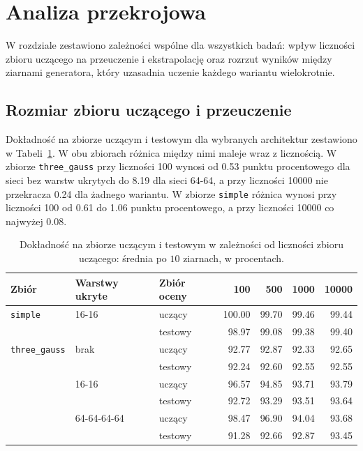 \section{Analiza przekrojowa}
\label{sec:cross}

W rozdziale zestawiono zależności wspólne dla wszystkich badań: wpływ liczności zbioru uczącego na przeuczenie i ekstrapolację oraz rozrzut wyników między ziarnami generatora, który uzasadnia uczenie każdego wariantu wielokrotnie.

\subsection{Rozmiar zbioru uczącego i przeuczenie}
\label{sec:cross-size}

Dokładność na zbiorze uczącym i testowym dla wybranych architektur zestawiono w Tabeli~\ref{tab:cross-size-classification}. W obu zbiorach różnica między nimi maleje wraz z licznością. W zbiorze \texttt{three\_gauss} przy liczności \num{100} wynosi od \num{0.53} punktu procentowego dla sieci bez warstw ukrytych do \num{8.19} dla sieci 64-64, a przy liczności \num{10000} nie przekracza \num{0.24} dla żadnego wariantu. W zbiorze \texttt{simple} różnica wynosi przy liczności \num{100} od \num{0.61} do \num{1.06} punktu procentowego, a przy liczności \num{10000} co najwyżej \num{0.08}.

\begin{table}[H]
    \centering
    \caption{Dokładność na zbiorze uczącym i testowym w zależności od liczności zbioru uczącego: średnia po $10$ ziarnach, w procentach.}
    \label{tab:cross-size-classification}
    \begin{tabular}{lllrrrr}
        \toprule
        Zbiór & Warstwy ukryte & Zbiór oceny & \num{100} & \num{500} & \num{1000} & \num{10000} \\
        \midrule
        \texttt{simple} & 16-16 & uczący & \num{100.00} & \num{99.70} & \num{99.46} & \num{99.44} \\
        & & testowy & \num{98.97} & \num{99.08} & \num{99.38} & \num{99.40} \\
        \midrule
        \texttt{three\_gauss} & brak & uczący & \num{92.77} & \num{92.87} & \num{92.33} & \num{92.65} \\
        & & testowy & \num{92.24} & \num{92.60} & \num{92.55} & \num{92.55} \\
        \addlinespace
        & 16-16 & uczący & \num{96.57} & \num{94.85} & \num{93.71} & \num{93.79} \\
        & & testowy & \num{92.72} & \num{93.29} & \num{93.51} & \num{93.64} \\
        \addlinespace
        & 64-64-64-64 & uczący & \num{98.47} & \num{96.90} & \num{94.04} & \num{93.68} \\
        & & testowy & \num{91.28} & \num{92.66} & \num{92.87} & \num{93.45} \\
        \bottomrule
    \end{tabular}
\end{table}


